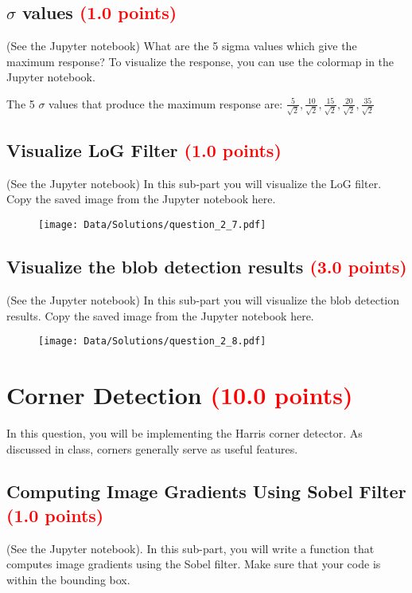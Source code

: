 \documentclass[answers]{exam}
\newcommand{\mypoints}[1]{\textcolor{red}{(#1 points)}}
\begin{document}
\subsection{$\sigma$ values \mypoints{1.0}}
(See the Jupyter notebook) What are the 5 sigma values which give the maximum response? To visualize the response, you can use the colormap in the Jupyter notebook.
\begin{solution}
The 5 $\sigma$ values that produce the maximum response are: $\frac{5}{\sqrt{2}}, \frac{10}{\sqrt{2}}, \frac{15}{\sqrt{2}},\frac{20}{\sqrt{2}},\frac{35}{\sqrt{2}}$
\end{solution}

\subsection{Visualize LoG Filter \mypoints{1.0}}
(See the Jupyter notebook) In this sub-part you will visualize the LoG filter. Copy the saved image from the Jupyter notebook here. 
\begin{solution}
    \begin{figure}[H]
        \centering
        \texttt{[image: Data/Solutions/question\_2\_7.pdf]}
    \end{figure}
\end{solution}

\subsection{Visualize the blob detection results \mypoints{3.0}}
(See the Jupyter notebook) In this sub-part you will visualize the blob detection results. Copy the saved image from the Jupyter notebook here. 
\begin{solution}
\begin{figure}[H]
    \centering
    \texttt{[image: Data/Solutions/question\_2\_8.pdf]}
\end{figure}
\end{solution}

\newpage
\section{Corner Detection \mypoints{10.0}}

In this question, you will be implementing the Harris corner detector. As discussed in class, corners generally serve as useful features.

\subsection{Computing Image Gradients Using Sobel Filter \mypoints{1.0}}
(See the Jupyter notebook). In this sub-part, you will write a function that computes image gradients using the Sobel filter. Make sure that your code is within the bounding box.
\end{document}
